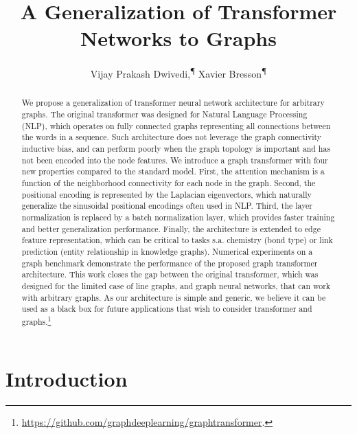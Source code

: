 \documentclass[letterpaper]{article} %
\title{A Generalization of Transformer Networks to Graphs}
\author {
    Vijay Prakash Dwivedi,\textsuperscript{\rm ¶} %
    Xavier Bresson\textsuperscript{\rm ¶} \\
}
\begin{document}
\maketitle

\begin{abstract}

We propose a generalization of transformer neural network architecture for arbitrary graphs.
The original transformer was designed for Natural Language Processing (NLP), which operates on fully connected graphs representing all connections between the words in a sequence. Such architecture does not leverage the graph connectivity inductive bias, and can perform poorly when the graph topology is important and has not been encoded into the node features. 
We introduce a graph transformer with four new properties compared to the standard model. 
First, the attention mechanism is a function of the neighborhood connectivity for each node in the graph. Second, the positional encoding is represented by the Laplacian eigenvectors, which naturally generalize the sinusoidal positional encodings often used in NLP. 
Third, the layer normalization is replaced by a batch normalization layer, which provides faster training and better generalization performance.
Finally, the architecture is extended to edge feature representation, which can be critical to tasks s.a. chemistry (bond type) or link prediction (entity relationship in knowledge graphs).
Numerical experiments on a graph benchmark demonstrate the performance of the proposed graph transformer architecture. 
This work closes the gap between the original transformer, which was designed for the limited case of line graphs, and graph neural networks, that can work with arbitrary graphs. 
As our architecture is simple and generic, we believe it can be used as a black box for future applications that wish to consider transformer and graphs.\footnote{\url{https://github.com/graphdeeplearning/graphtransformer}.}



\end{abstract}


\section{Introduction}
\end{document}
